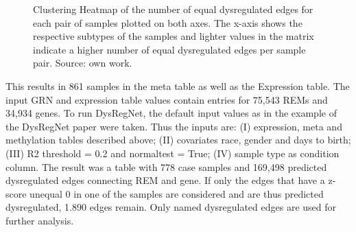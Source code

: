 \documentclass[pdftex,12pt,a4paper]{report}
\begin{document}
\begin{figure}[!ht]
\begin{center}
	\caption{Clustering Heatmap of the number of equal dysregulated edges for each pair of samples plotted on both axes. The x-axis shows the respective subtypes of the samples and lighter values in the matrix indicate a higher number of equal dysregulated edges per sample pair. Source: own work.}
	\label{brca_clustmap}
\end{center}
\end{figure} 
This results in 861 samples in the meta table as well as the Expression table. The input GRN and expression table values contain entries for 75,543 REMs and 34,934 genes.
To run DysRegNet, the default input values as in the example of the DysRegNet paper\cite{dysregnet} were taken. Thus the inputs are: (I) expression, meta and methylation tables described above; (II) covariates race, gender and days to birth; (III) R2 threshold = 0.2 and normaltest = True; (IV) sample type as condition column.
The result was a table with 778 case samples and 169,498 predicted dysregulated edges connecting REM and gene. If only the edges that have a z-score unequal 0 in one of the samples are considered and are thus predicted dysregulated, 1.890 edges remain. Only named dysregulated edges are used for further analysis. 
\end{document}
